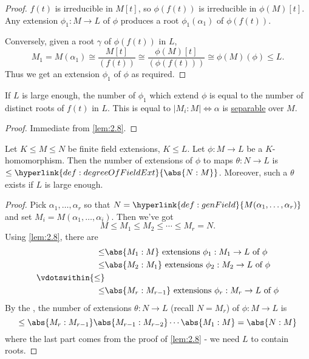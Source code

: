 \documentclass{article}
\begin{document}
\begin{proof}
    $f(t)$ is irreducible in $M[t]$, so $\phi(f(t))$ is irreducible in $\phi(M)[t]$.
    Any extension $\phi_1: M \to L$ of $\phi$ produces a root $\phi_1(\alpha_1)$ of $\phi(f(t))$.

    Conversely, given a root $\gamma$ of $\phi(f(t))$ in $L$,
    \begin{equation*}
        M_1 = M(\alpha_1) \cong \frac{M[t]}{(f(t))} \cong \frac{\phi(M)[t]}{(\phi(f(t)))} \cong \phi(M)(\phi) \leq L.
    \end{equation*}
    Thus we get an extension $\phi_1$ of $\phi$ as required.
\end{proof}

\begin{ncor}\label{cor:2.9}
    If $L$ is large enough, the number of $\phi_1$ which extend $\phi$ is equal to the number of distinct roots of $f(t)$ in $L$.
    This is equal to $|M_i:M| \iff \alpha$ is \hyperlink{def:separableExt}{separable} over $M$.
\end{ncor}

\begin{proof}
    Immediate from \cref{lem:2.8}.
\end{proof}

\begin{ncor}\label{cor:2.10}
    Let $K \leq M \leq N$ be finite field extensions, $K \leq L$. Let $\phi: M \to L$ be a $K$-homomorphism.
    Then the number of extensions of $\phi$ to maps $\theta:N \to L$ is $\leq \hyperlink{def:degreeOfFieldExt}{\abs{N:M}}$.
    Moreover, such a $\theta$ exists if $L$ is large enough.
\end{ncor}

\begin{proof}
    Pick $\alpha_1, \dotsc, \alpha_r$ so that $N = \hyperlink{def:genField}{M(\alpha_1, \dotsc, \alpha_r)}$ and set $M_i = M(\alpha_1, \dotsc,\alpha_i)$. Then we've got
    \begin{equation*}
        M \leq M_1 \leq M_2 \leq \dotsb \leq M_r = N.
    \end{equation*}
    Using \cref{lem:2.8}, there are
    \begin{align*}
        \leq& \abs{M_1:M} \text{ extensions } \phi_1 : M_1 \to L \text{ of } \phi \\
        \leq& \abs{M_2:M_1} \text{ extensions } \phi_2 : M_2 \to L \text{ of } \phi \\
        \vdotswithin{\leq}\\
        \leq& \abs{M_r:M_{r-1}} \text{ extensions } \phi_r : M_r \to L \text{ of } \phi
    \end{align*}
    By the , the number of extensions $\theta: N \to L$ (recall $N=M_r$) of $\phi:M \to L$ is
    \begin{equation*}
        \leq \abs{M_r:M_{r-1}} \abs{M_{r-1}:M_{r-2}} \cdots \abs{M_1:M} = \abs{N:M}
    \end{equation*}
    where the last part comes from the proof of \cref{lem:2.8} - we need $L$ to contain roots.
\end{proof}
\end{document}
